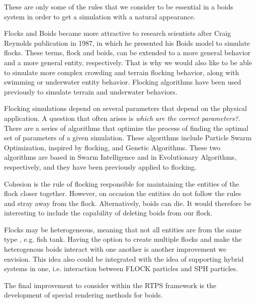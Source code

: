 These are only some of the rules that we consider to be essential in a boids system in order to get a simulation with a natural appearance.

Flocks and Boids became more attractive to research scientists after Craig Reynolds publication in 1987\cite{craig1}, in which he presented his Boids model to simulate flocks. These terms, flock and boids, can be extended to a more general behavior and a more general entity, respectively. That is why we would also like to be able to simulate more complex crowding and terrain flocking behavior, along with swimming or underwater entity behavior. Flocking algorithms have been used previously to simulate terrain and underwater behaviors\cite{supermassiveCrowd}. 

Flocking simulations depend on several parameters that depend on the physical application. A question that often arises is \textit{which are the correct parameters?}. There are a series of algorithms that optimize the process of finding the optimal set of parameters of a given simulation. These algorithms include Particle Swarm Optimization, inspired by flocking, and Genetic Algorithms. These two algorithms are based in Swarm Intelligence and in Evolutionary Algorithms, respectively, and they have been previously applied to flocking\cite{opt_params_GA}.

Cohesion is the rule of flocking responsible for maintaining the entities of the flock closer together. However, on occasion the entities do not follow the rules and stray away from the flock. Alternatively, boids can die. It would therefore be interesting to include the capability of deleting boids from our flock. 

Flocks may be heterogeneous, meaning that not all entities are from the same type , e.g. fish tank. Having the option to create multiple flocks and make the heterogenous boids interact with one another is another improvement we envision. This idea also could be integrated  with the idea of supporting hybrid systems in one, i.e. interaction between FLOCK particles and SPH particles.

The final improvement to consider within the RTPS framework is the development of special rendering methods for boids. 

